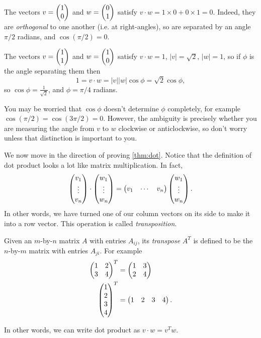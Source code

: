 \documentclass{article}
\begin{document}
\begin{Example}
The vectors \(v=\begin{pmatrix} 1 \\ 0 \end{pmatrix}\) and \(w=\begin{pmatrix} 0 \\ 1 \end{pmatrix}\) satisfy
\(v\cdot w=1\times 0+0\times 1=0\). Indeed, they are {\em
orthogonal} to one another (i.e. at right-angles), so are separated
by an angle \(\pi/2\) radians, and \(\cos(\pi/2)=0\).


\end{Example}
\begin{Example}
The vectors \(v=\begin{pmatrix} 1 \\ 1 \end{pmatrix}\) and \(w=\begin{pmatrix} 1 \\ 0 \end{pmatrix}\) satisfy
\(v\cdot w=1\), \(|v|=\sqrt{2}\), \(|w|=1\), so if \(\phi\) is the
angle separating them then \[1=v\cdot
w=|v||w|\cos\phi=\sqrt{2}\cos\phi,\] so
\(\cos\phi=\frac{1}{\sqrt{2}}\), and \(\phi=\pi/4\) radians.


\end{Example}
\begin{Remark}
You may be worried that \(\cos\phi\) doesn't determine \(\phi\)
completely, for example \(\cos(\pi/2)=\cos(3\pi/2)=0\). However, the
ambiguity is precisely whether you are measuring the angle from
\(v\) to \(w\) clockwise or anticlockwise, so don't worry unless
that distinction is important to you.


\end{Remark}
We now move in the direction of proving \cref{thm:dot}. Notice that
the definition of dot product looks a lot like matrix
multiplication. In fact, \[\begin{pmatrix} v_1\\ \vdots\\v_n\end{pmatrix}\cdot\begin{pmatrix}
w_1\\\vdots\\ w_n\end{pmatrix}=\begin{pmatrix} v_1 & \cdots & v_n\end{pmatrix}\begin{pmatrix}
w_1\\\vdots\\ w_n\end{pmatrix}.\] In other words, we have turned one of our
column vectors on its side to make it into a row vector. This
operation is called {\em transposition}.


\begin{Definition}
Given an \(m\)-by-\(n\) matrix \(A\) with entries \(A_{ij}\), its
{\em transpose} \(A^T\) is defined to be the \(n\)-by-\(m\) matrix
with entries \(A_{ji}\). For example
\begin{align*}
\begin{pmatrix} 1 & 2\\ 3 & 4\end{pmatrix}^T&=\begin{pmatrix} 1 & 3 \\2 & 4\end{pmatrix}\\
\begin{pmatrix} 1 \\ 2 \\ 3 \\ 4\end{pmatrix}^T&=\begin{pmatrix} 1 & 2 & 3 &4\end{pmatrix}.
\end{align*}


\end{Definition}
In other words, we can write dot product as \(v\cdot w=v^Tw\).
\end{document}
